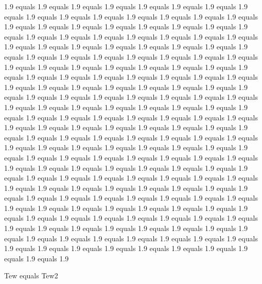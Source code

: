 1.9 equals 1.9 equals 1.9 equals 1.9 equals 1.9 equals 1.9 equals 1.9 equals 1.9 equals 1.9 equals 1.9 equals 1.9 equals 1.9 equals 1.9 equals 1.9 equals 1.9 equals 1.9 equals 1.9 equals 1.9 equals 1.9 equals 1.9 equals 1.9 equals 1.9 equals 1.9 equals 1.9 equals 1.9 equals 1.9 equals 1.9 equals 1.9 equals 1.9 equals 1.9 equals 1.9 equals 1.9 equals 1.9 equals 1.9 equals 1.9 equals 1.9 equals 1.9 equals 1.9 equals 1.9 equals 1.9 equals 1.9 equals 1.9 equals 1.9 equals 1.9 equals 1.9 equals 1.9 equals 1.9 equals 1.9 equals 1.9 equals 1.9 equals 1.9 equals 1.9 equals 1.9 equals 1.9 equals 1.9 equals 1.9 equals 1.9 equals 1.9 equals 1.9 equals 1.9 equals 1.9 equals 1.9 equals 1.9 equals 1.9 equals 1.9 equals 1.9 equals 1.9 equals 1.9 equals 1.9 equals 1.9 equals 1.9 equals 1.9 equals 1.9 equals 1.9 equals 1.9 equals 1.9 equals 1.9 equals 1.9 equals 1.9 equals 1.9 equals 1.9 equals 1.9 equals 1.9 equals 1.9 equals 1.9 equals 1.9 equals 1.9 equals 1.9 equals 1.9 equals 1.9 equals 1.9 equals 1.9 equals 1.9 equals 1.9 equals 1.9 equals 1.9 equals 1.9 equals 1.9 equals 1.9 equals 1.9 equals 1.9 equals 1.9 equals 1.9 equals 1.9 equals 1.9 equals 1.9 equals 1.9 equals 1.9 equals 1.9 equals 1.9 equals 1.9 equals 1.9 equals 1.9 equals 1.9 equals 1.9 equals 1.9 equals 1.9 equals 1.9 equals 1.9 equals 1.9 equals 1.9 equals 1.9 equals 1.9 equals 1.9 equals 1.9 equals 1.9 equals 1.9 equals 1.9 equals 1.9 equals 1.9 equals 1.9 equals 1.9 equals 1.9 equals 1.9 equals 1.9 equals 1.9 equals 1.9 equals 1.9 equals 1.9 equals 1.9 equals 1.9 equals 1.9 equals 1.9 equals 1.9 equals 1.9 equals 1.9 equals 1.9 equals 1.9 equals 1.9 equals 1.9 equals 1.9 equals 1.9 equals 1.9 equals 1.9 equals 1.9 equals 1.9 equals 1.9 equals 1.9 equals 1.9 equals 1.9 equals 1.9 equals 1.9 equals 1.9 equals 1.9 equals 1.9 equals 1.9 equals 1.9 equals 1.9 equals 1.9 equals 1.9 equals 1.9 equals 1.9 equals 1.9 equals 1.9 equals 1.9 equals 1.9 equals 1.9 equals 1.9 equals 1.9 equals 1.9 equals 1.9 equals 1.9 equals 1.9 equals 1.9 equals 1.9 equals 1.9 equals 1.9 equals 1.9 equals 1.9 equals 1.9

Tew equals Tew2